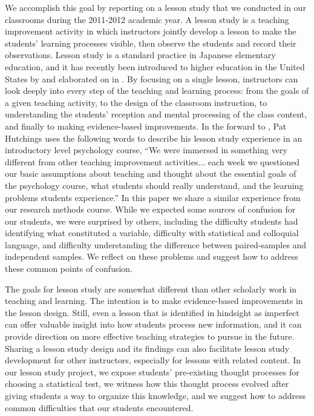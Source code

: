 \documentclass[12pt]{article}
\begin{document}
We accomplish this goal by reporting on a lesson study that we conducted in our classrooms during the 2011-2012 academic year.  A lesson study is a teaching improvement activity in which instructors jointly develop a lesson to make the students' learning processes visible, then observe the students and record their observations.  Lesson study is a standard practice in Japanese elementary education, and it has recently been introduced to higher education in the United States by \citet*{cerbinkopp} and elaborated on in \citet*{cerbinbook}.  By focusing on a single lesson, instructors can look deeply into every step of the teaching and learning process: from the goals of a given teaching activity, to the design of the classroom instruction, to understanding the students' reception and mental processing of the class content, and finally to making evidence-based improvements.  In the forward to \citet*{cerbinbook}, Pat Hutchings uses the following words to describe his lesson study experience in an introductory level psychology course, ``We were immersed in something very different from other teaching improvement activities... each week we questioned our basic assumptions about teaching and thought about the essential goals of the psychology course, what students should really understand, and the learning problems students experience.''  In this paper we share a similar experience from our research methods course.  While we expected some sources of confusion for our students, we were surprised by others, including the difficulty students had identifying what constituted a variable, difficulty with statistical and colloquial language, and difficulty understanding the difference between paired-samples and independent samples.  We reflect on these problems and suggest how to address these common points of confusion. 

The goals for lesson study are somewhat different than other scholarly work in teaching and learning.  The intention is to make evidence-based improvements in the lesson design.  Still, even a lesson that is identified in hindsight as imperfect can offer valuable insight into how students process new information, and it can provide direction on more effective teaching strategies to pursue in the future.   Sharing a lesson study design and its findings can also facilitate lesson study development for other instructors, especially for lessons with related content.  In our lesson study project, we expose students' pre-existing thought processes for choosing a statistical test, we witness how this thought process evolved after giving students a way to organize this knowledge, and we suggest how to address common difficulties that our students encountered. 
\end{document}

